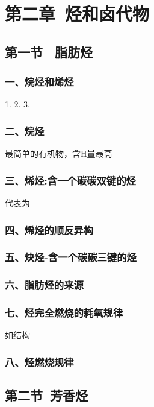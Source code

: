 \documentclass{book}
\begin{document}

\chapter{第二章\ 烃和卤代物}

\section{第一节 \ 脂肪烃}

\subsection{一、烷烃和烯烃}
1. 
2.
3.

\subsection{二、烷烃}
最简单的有机物，含H量最高 


\subsection{三、烯烃:含一个碳碳双键的烃}
代表为

\subsection{四、烯烃的顺反异构}

\subsection{五、炔烃-含一个碳碳三键的烃}

\subsection{六、脂肪烃的来源}

\subsection{七、烃\textbf{完全燃烧}的耗氧规律}
如结构

\subsection{八、烃燃烧规律 }


\section{第二节\ 芳香烃}
\end{document}
